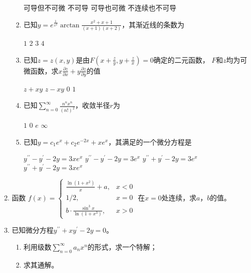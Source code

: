 \begin{enumerate}
\begin{enumerate}
\fourchoices
{可导但不可微}
{不可导}
{可导也可微}
{不连续也不可导}


\item 
已知$y=e^{\frac{1}{x^2}} \arctan \frac{x^2+x+1}{(x+1)(x+2)}$，其渐近线的条数为  

\fourchoices
{$ 1 $}
{$ 2 $}
{$ 3 $}
{$ 4 $}

\item 
已知$z=z(x, y)$是由$F\left(x+\frac{z}{y}, y+\frac{z}{x}\right)=0$确定的二元函数，
$ F $和$ z $均为可微函数，求$x \frac{\partial z}{\partial x}+y \frac{\partial z}{\partial y}$的值  


\fourchoices
{$z+x y $}
{$ z-x y $}
{$ 0$}
{$ 1 $}


\item 
已知$\sum\limits_{n=0}^{\infty} \frac{n^n x^n}{(n !)^2}$，收敛半径$ r $为  

\fourchoices
{$ 1 $}
{$ 0 $}
{$ e $}
{$ \infty $}

\item 
已知$y=c_1 e^x+c_2 e^{-2 x}+x e^x$，其满足的一个微分方程是  

\fourchoices
{$y^{\prime \prime}-y^{\prime}-2 y=3 x e^x$}
{$y^{\prime \prime}-y^{\prime}-2 y=3 e^x$}
{$y^{\prime \prime}+y^{\prime}-2 y=3 e^x$}
{$y^{\prime \prime}+y^{\prime}-2 y=3 x e^x$}




		
\end{enumerate}



	
\item 
函数
$ 
	f(x)=\left\{\begin{array}{cc}
	\frac{\ln \left(1+x^2\right)}{x}+a, & x<0 \\
	1 / 2, &  x=0 \\
	b \cdot \frac{\sin ^3 x}{\ln \left(1+x^3\right)}, &  x>0
\end{array}\right.
 $
在$ x=0 $处连续，求$ a $，$ b $的值。



\newpage
\item 
已知微分方程$y^{\prime \prime}+x y^{\prime}-2 y=0$。
\begin{enumerate}
	\item
	利用级数$\sum\limits_{n=0}^{\infty} a_n x^n$的形式，求一个特解；
	\item 
	求其通解。
	

\end{enumerate}
\end{enumerate}

